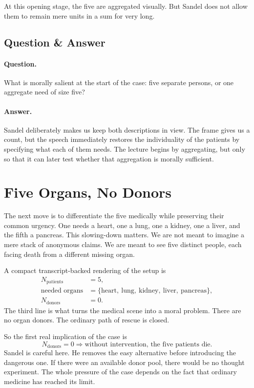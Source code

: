 At this opening stage, the five are aggregated visually. But Sandel does not allow them to remain mere units in a sum for very long.

\subsection{Question \& Answer}

\paragraph{Question.} What is morally salient at the start of the case: five separate persons, or one aggregate need of size five?

\paragraph{Answer.} Sandel deliberately makes us keep both descriptions in view. The frame gives us a count, but the speech immediately restores the individuality of the patients by specifying what each of them needs. The lecture begins by aggregating, but only so that it can later test whether that aggregation is morally sufficient.

\section{Five Organs, No Donors}

The next move is to differentiate the five medically while preserving their common urgency. One needs a heart, one a lung, one a kidney, one a liver, and the fifth a pancreas. This slowing-down matters. We are not meant to imagine a mere stack of anonymous claims. We are meant to see five distinct people, each facing death from a different missing organ.

A compact transcript-backed rendering of the setup is
\begin{align}
N_{\text{patients}} &= 5,\\
\text{needed organs} &= \{\text{heart},\ \text{lung},\ \text{kidney},\ \text{liver},\ \text{pancreas}\},\\
N_{\text{donors}} &= 0.
\end{align}
The third line is what turns the medical scene into a moral problem. There are no organ donors. The ordinary path of rescue is closed.

So the first real implication of the case is
\begin{equation}
N_{\text{donors}} = 0
\Longrightarrow
\text{without intervention, the five patients die}.
\end{equation}
Sandel is careful here. He removes the easy alternative before introducing the dangerous one. If there were an available donor pool, there would be no thought experiment. The whole pressure of the case depends on the fact that ordinary medicine has reached its limit.

